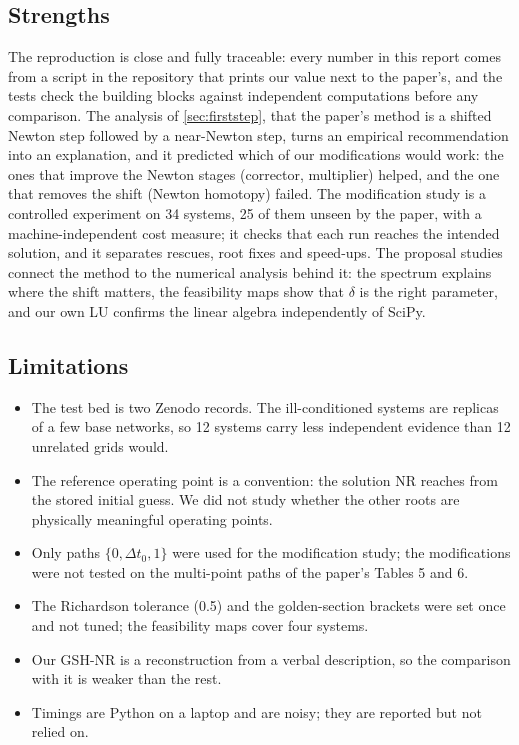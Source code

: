 \documentclass[11pt,a4paper]{article}
\begin{document}
\subsection{Strengths}
The reproduction is close and fully traceable: every number in this report comes from a script in the
repository that prints our value next to the paper's, and the tests check the building blocks against
independent computations before any comparison. The analysis of \cref{sec:firststep}, that the paper's
method is a shifted Newton step followed by a near-Newton step, turns an empirical recommendation into an
explanation, and it predicted which of our modifications would work: the ones that improve the Newton stages
(corrector, multiplier) helped, and the one that removes the shift (Newton homotopy) failed. The
modification study is a controlled experiment on 34 systems, 25 of them unseen by the paper, with a
machine-independent cost measure; it checks that each run reaches the intended solution, and it separates
rescues, root fixes and speed-ups. The proposal studies connect the method to the numerical analysis behind
it: the spectrum explains where the shift matters, the feasibility maps show that $\delta$ is the right
parameter, and our own LU confirms the linear algebra independently of SciPy.

\subsection{Limitations}
\begin{itemize}
  \item The test bed is two Zenodo records. The ill-conditioned systems are replicas of a few base networks,
        so 12 systems carry less independent evidence than 12 unrelated grids would.
  \item The reference operating point is a convention: the solution NR reaches from the stored initial
        guess. We did not study whether the other roots are physically meaningful operating points.
  \item Only paths $\{0,\Delta t_0,1\}$ were used for the modification study; the modifications were not
        tested on the multi-point paths of the paper's Tables 5 and 6.
  \item The Richardson tolerance (0.5) and the golden-section brackets were set once and not tuned; the
        feasibility maps cover four systems.
  \item Our GSH-NR is a reconstruction from a verbal description, so the comparison with it is weaker than
        the rest.
  \item Timings are Python on a laptop and are noisy; they are reported but not relied on.
\end{itemize}
\end{document}
